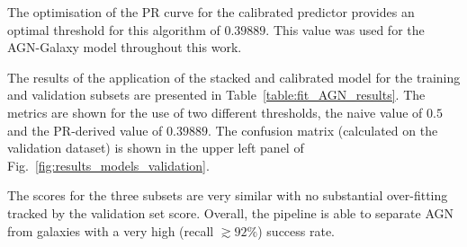 \documentclass{aa}
\begin{document}
\begin{table}
  \caption{Best performing models for the AGN-galaxy classification}             %
  \label{table:fit_AGN_models}      %
  \centering                          %
  \end{table}

The optimisation of the PR curve for the calibrated predictor provides an optimal threshold for this algorithm of $0.39889$. This value was used for the AGN-Galaxy model throughout this work.

The results of the application of the stacked and calibrated model for the training and validation subsets are presented in Table~\ref{table:fit_AGN_results}. The metrics are shown for the use of two different thresholds, the naive value of $0.5$ and the  PR-derived value of $0.39889$. The confusion matrix (calculated on the validation dataset) is shown in the upper left panel of Fig.~\ref{fig:results_models_validation}. 

The scores for the three subsets are very similar with no substantial over-fitting tracked by the validation set score.
Overall, the pipeline is able to separate AGN from galaxies with a very high (recall ${\gtrsim} 92\%$) success rate.
\end{document}
